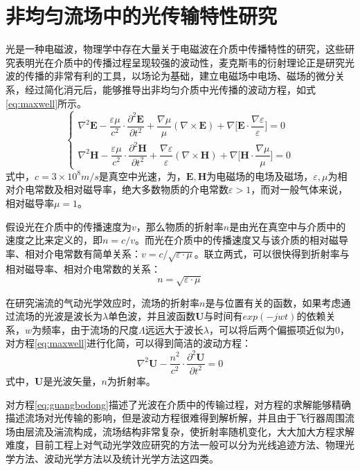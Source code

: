 \chapter{非均匀流场中的光传输特性研究}
光是一种电磁波，物理学中存在大量关于电磁波在介质中传播特性的研究，这些研究表明光在介质中的传播过程呈现较强的波动性，麦克斯韦的衍射理论正是研究光波的传播的非常有利的工具，以场论为基础，建立电磁场中电场、磁场的微分关系，经过简化消元后，能够推导出非均匀介质中光传播的波动方程，如式\eqref{eq:maxwell}所示。
\begin{equation}
\begin{cases}
\nabla^2\mathbf{E}-\dfrac{\varepsilon\mu}{c^2}\cdot\dfrac{\partial^2\mathbf{E}}{\partial t^2}+\dfrac{\nabla\mu}{\mu}(\nabla\times\mathbf{E})+\nabla\big[\mathbf{E}\cdot\dfrac{\nabla\varepsilon}{\varepsilon}\big]=0\\
\nabla^2\mathbf{H}-\dfrac{\varepsilon\mu}{c^2}\cdot\dfrac{\partial^2\mathbf{H}}{\partial t^2}+\dfrac{\nabla\varepsilon}{\varepsilon}(\nabla\times\mathbf{H})+\nabla\big[\mathbf{H}\cdot\dfrac{\nabla\mu}{\mu}\big]=0
\end{cases}
\label{eq:maxwell}
\end{equation}
式中，$c=3\times10^8m/s$是真空中光速，为，$\mathbf{E},\mathbf{H}$为电磁场的电场及磁场，$\varepsilon,\mu$为相对介电常数及相对磁导率，绝大多数物质的介电常数$\varepsilon>1$，而对一般气体来说，相对磁导率$\mu=1$。

假设光在介质中的传播速度为$v$，那么物质的折射率$n$是由光在真空中与介质中的速度之比来定义的，即$n=c/v$。而光在介质中的传播速度又与该介质的相对磁导率、相对介电常数有简单关系：$v=c/\sqrt{\varepsilon\cdot\mu}$。联立两式，可以很快得到折射率与相对磁导率、相对介电常数的关系：
\begin{equation}
n=\sqrt{\varepsilon\cdot\mu}
\end{equation}

在研究湍流的气动光学效应时，流场的折射率$n$是与位置有关的函数，如果考虑通过流场的光波是波长为$\lambda$单色波，并且波函数$\mathbf{U}$与时间有$exp(-jwt)$的依赖关系，$w$为频率，由于流场的尺度$\Lambda$远远大于波长$\lambda$，可以将后两个偏振项近似为0，对方程\eqref{eq:maxwell}进行化简，可以得到简洁的波动方程：
\begin{equation}
\nabla^2\mathbf{U}-\frac{n^2}{c^2}\cdot\frac{\partial^2\mathbf{U}}{\partial t^2}=0
\label{eq:guangbodong}
\end{equation}
式中，$\mathbf{U}$是光波矢量，$n$为折射率。

对方程\eqref{eq:guangbodong}描述了光波在介质中的传输过程，对方程的求解能够精确描述流场对光传输的影响，但是波动方程很难得到解析解，并且由于飞行器周围流场由层流及湍流构成，流场结构非常复杂，使折射率随机变化，大大加大方程求解难度，目前工程上对气动光学效应研究的方法一般可以分为光线追迹方法、物理光学方法、波动光学方法以及统计光学方法这四类\cite{sutton1994}。

